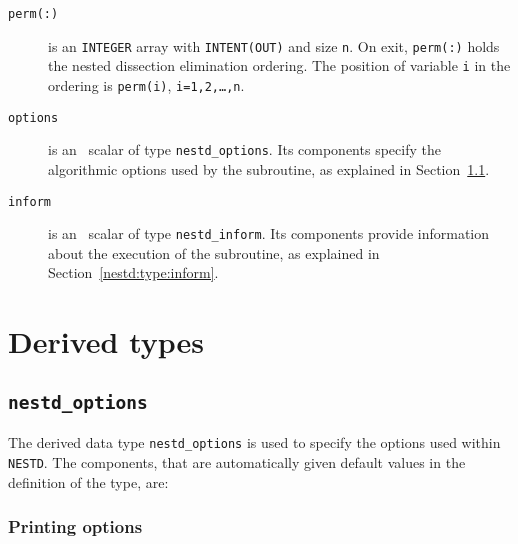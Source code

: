\begin{description}
\item[\texttt{perm(:)}] is an {\tt INTEGER} array with {\tt INTENT(OUT)} and size
{\tt n}.  On exit, {\tt perm(:)} holds the nested dissection elimination ordering. 
The position of variable {\tt i} in the ordering is  {\tt perm(i)},
{\tt i=1,2,\ldots,n}.


\item[\texttt{options}] is an \intentin\ scalar of type {\tt nestd\_options}.
Its components specify the algorithmic options used by the subroutine, as
explained in Section~\ref{nestd:type:options}.

\item[\texttt{inform}] is an \intentout\ scalar of type
{\tt nestd\_inform}. Its components provide information about the execution
of the subroutine, as explained in Section~\ref{nestd:type:inform}.


\end{description}




\section{Derived types}
\subsection{\texttt{nestd\_options}}
\label{nestd:type:options}

The derived data type {\tt nestd\_options} is used to specify the options used
within \texttt{NESTD}. The components, that are automatically
given default values in the definition of the type, are: \\

\subsubsection*{Printing options}

